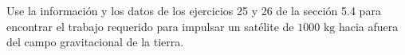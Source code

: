 \item Use la información y los datos de los ejercicios 25 y 26 de la sección 5.4 para encontrar el trabajo requerido para impulsar un satélite de $1000 \text{ kg}$ hacia afuera del campo gravitacional de la tierra.
